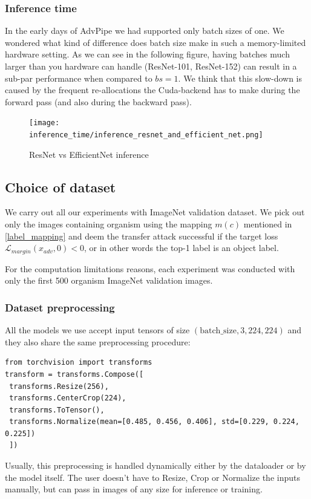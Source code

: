 \subsubsection{Inference time}
In the early days of AdvPipe we had supported only batch sizes of one. We wondered what kind of difference does batch size make in such a memory-limited hardware setting. As we can see in the following figure, having batches much larger than you hardware can handle (ResNet-101, ResNet-152) can result in a sub-par performance when compared to $bs=1$. We think that this slow-down is caused by the frequent re-allocations the Cuda-backend has to make during the forward pass (and also during the backward pass).

\begin{figure}[!htb]
  \texttt{[image: inference\_time/inference\_resnet\_and\_efficient\_net.png]}
\caption{ResNet vs EfficientNet inference}
\label{fig:fgsm_margin}
\end{figure}



\subsection{Choice of dataset}
We carry out all our experiments with ImageNet validation dataset. We pick out only the images containing organism using the mapping $m(c)$ mentioned in \ref{label_mapping} and deem the transfer attack successful if the target loss $\mathcal{L}_{margin}(x_{adv}, 0) < 0$, or in other words the top-1 label is an object label.

For the computation limitations reasons, each experiment was conducted with only the first 500 organism ImageNet validation images.

\subsubsection{Dataset preprocessing}
\label{dataset_preprocessing}
All the models we use accept input tensors of size $(\text{batch\_size}, 3, 224, 224)$ and they also share the same preprocessing procedure:
\begin{verbatim}
from torchvision import transforms
transform = transforms.Compose([
 transforms.Resize(256),
 transforms.CenterCrop(224),
 transforms.ToTensor(),
 transforms.Normalize(mean=[0.485, 0.456, 0.406], std=[0.229, 0.224, 0.225])
 ])
\end{verbatim}

Usually, this preprocessing is handled dynamically either by the dataloader or by the model itself. The user doesn't have to Resize, Crop or Normalize the inputs manually, but can pass in images of any size for inference or training.

